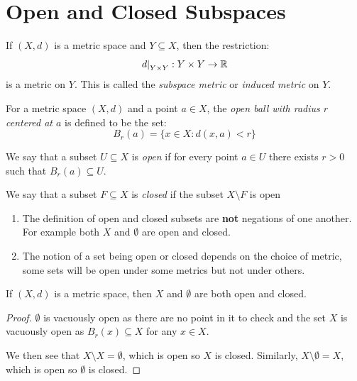 \documentclass[../main.tex]{subfiles}
\begin{document}
\section{Open and Closed Subspaces}
\begin{definition}
  If $(X, d)$ is a metric space and $Y \subseteq X$, then the restriction:
  \[
    \left. d \right|_{Y\times Y}: Y \times Y \to \mathbb{R}
  \]
  is a metric on $Y$.
  This is called the \textit{subspace metric} or \textit{induced metric} on $Y$.
\end{definition}
\begin{definition}
  For a metric space $(X, d)$ and a point $a \in X$, the \textit{open ball with radius $r$ centered at $a$} is defined to be the set:
  \[
    B_r(a) = \{x \in X: d(x, a) < r\}
  \]
\end{definition}
\begin{definition}
  We say that a subset $U \subseteq X$  is \textit{open} if for every point $a \in U$ there exists $r > 0$  such that $B_r(a) \subseteq U$.
\end{definition}
\begin{definition}
  We say that a subset $F \subseteq X$  is \textit{closed} if the subset $X \setminus F$ is open
\end{definition}
\begin{remark}[Warning]
  \begin{enumerate}
    \item The definition of open and closed subsets are \textbf{not} negations of one another.
      For example both $X$ and $\emptyset$ are open and closed.
    \item The notion of a set being open or closed depends on the choice of metric, some sets will be open under some metrics but not under others.
  \end{enumerate}
\end{remark}
\begin{lemma}
  If $(X, d)$ is a metric space, then $X$ and $\emptyset$ are both open and closed. \label{emptyClosed}
\end{lemma}
\begin{proof}
  $\emptyset$ is vacuously open as there are no point in it to check and the set $X$ is vacuously open as $B_r(x) \subseteq X$ for any $x \in X$.

  We then see that $X \setminus X = \emptyset$, which is open so $X$ is closed.
  Similarly, $X \setminus \emptyset = X$, which is open so $\emptyset$ is closed.
\end{proof}
\end{document}

